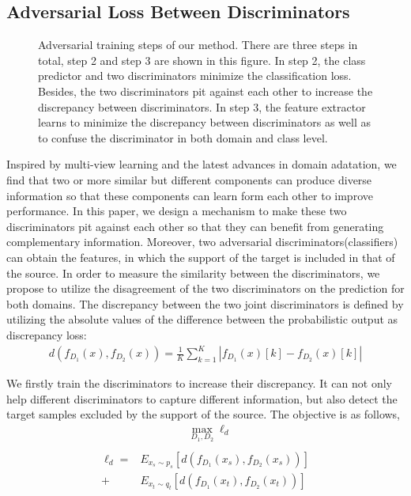 \documentclass{ecai}
\begin{document}
\subsection{Adversarial Loss Between Discriminators}

\begin{figure*}[htbp]
\centering
{}
\caption{Adversarial training steps of our method. There are three steps in total, step 2 and step 3 are shown in this figure. In step 2, the class predictor and two discriminators minimize the classification loss. Besides, the two discriminators pit against each other to increase the discrepancy between discriminators. In step 3, the feature extractor learns to minimize the discrepancy between discriminators as well as to confuse the discriminator in both domain and class level.}
\label{train}
\end{figure*}

Inspired by multi-view learning\cite{b19} and the latest advances in domain adatation\cite{b24,b31}, we  find that two or more similar but different components can produce diverse information so that these components can learn form each other to improve performance. In this paper, we design a mechanism to make these two discriminators pit against each other so that they can benefit from generating complementary information. Moreover, two adversarial discriminators(classifiers) can obtain the features, in which the support of the target is included in that of the source. In order to measure the similarity between the discriminators, we propose to utilize the disagreement of the two discriminators on the prediction for both domains.
The discrepancy between the two joint discriminators is defined by utilizing the absolute values of the difference between the probabilistic output as discrepancy loss:
\begin{align}
d(f_{D_1}(x),f_{D_2}(x)) = \frac{1}{K}\sum_{k=1}^K|{f_{D_1}(x)}[k] - {f_{D_2}(x)}[k]|
\end{align}

We firstly train the discriminators to increase their discrepancy. It can not only help different discriminators to capture different information, but also detect the target
samples excluded by the support of the source\cite{b24}. The objective is as follows,
\begin{equation}
\begin{aligned}
& \max_{D_1,D_2} \ell_{d} \\
\end{aligned}
\end{equation}
\begin{equation}
\begin{aligned}
\ell_{d}= &E_{x_s \sim p_s}[d(f_{D_1}(x_s),f_{D_2}(x_s))]     \\
                   + &E_{x_t \sim q_t}[d(f_{D_1}(x_t),f_{D_2}(x_t))]
\end{aligned}
\end{equation}
\end{document}
